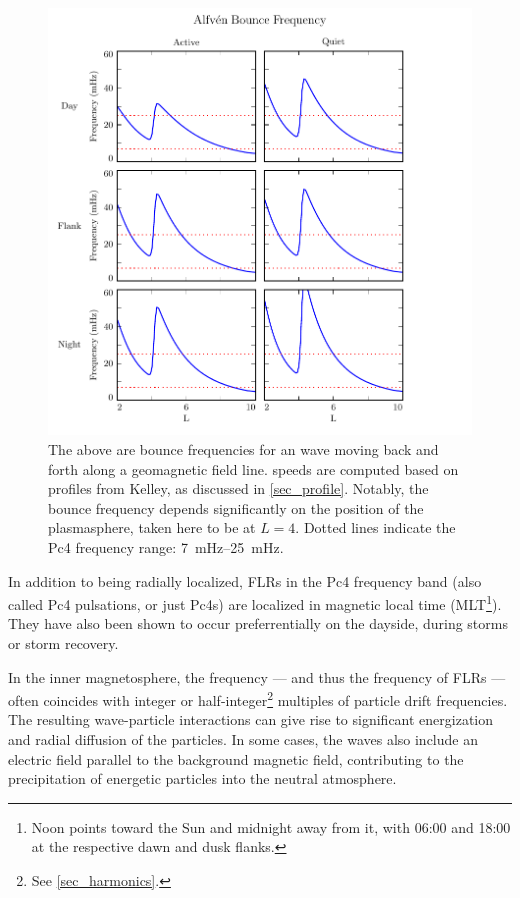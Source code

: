 \begin{figure}[!htb]
    \centering
    \includegraphics[width=\textwidth]{figures/fa.pdf}
    \caption[\Alfven Bounce Frequencies]{
      The above are bounce frequencies for an \Alfven wave moving back and forth along a geomagnetic field line. \Alfven speeds are computed based on profiles from Kelley\cite{kelley_1989}, as discussed in \cref{sec_profile}. Notably, the bounce frequency depends significantly on the position of the plasmasphere, taken here to be at $L=4$. Dotted lines indicate the Pc4 frequency range: \SIrange{7}{25}{\mHz}. 
    }
    \label{fig_fa}
\end{figure}

In addition to being radially localized, FLRs in the Pc4 frequency band (also called Pc4 pulsations, or just Pc4s) are localized in magnetic local time (MLT\footnote{Noon points toward the Sun and midnight away from it, with 06:00 and 18:00 at the respective dawn and dusk flanks. }). They have also been shown to occur preferrentially on the dayside, during storms or storm recovery\cite{anderson_1990,dai_2015,engebretson_1992,kokubun_1989,liu_2009,ukhorskiy_2005}. 

In the inner magnetosphere, the \Alfven frequency --- and thus the frequency of FLRs --- often coincides with integer or half-integer\footnote{See \cref{sec_harmonics}. } multiples of particle drift frequencies\cite{dai_2013}. The resulting wave-particle interactions can give rise to significant energization and radial diffusion of the particles. In some cases, the waves also include an electric field parallel to the background magnetic field, contributing to the precipitation of energetic particles into the neutral atmosphere\cite{goertz_1984,goertz_1979,thompson_1996,wygant_2002}. 


